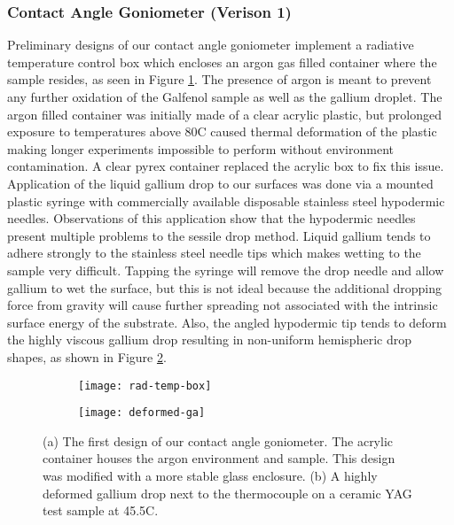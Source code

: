 \subsubsection{Contact Angle Goniometer (Verison 1)}
Preliminary designs of our contact angle goniometer implement a radiative temperature control box which encloses an argon gas filled container where the sample resides, as seen in Figure \ref{fig:rad-temp-box}.  The presence of argon is meant to prevent any further oxidation of the Galfenol sample as well as the gallium droplet. The argon filled container was initially made of a clear acrylic plastic, but prolonged exposure to temperatures above 80\degree C caused thermal deformation of the plastic making longer experiments impossible to perform without environment contamination.  A clear pyrex container replaced the acrylic box to fix this issue.  Application of the liquid gallium drop to our surfaces was done via a mounted plastic syringe with commercially available disposable stainless steel hypodermic needles.  Observations of this application show that the hypodermic needles present multiple problems to the sessile drop method.  Liquid gallium tends to adhere strongly to the stainless steel needle tips which makes wetting to the sample very difficult.  Tapping the syringe will remove the drop needle and allow gallium to wet the surface, but this is not ideal because the additional dropping force from gravity will cause further spreading not associated with the intrinsic surface energy of the substrate.  Also, the angled hypodermic tip tends to deform the highly viscous gallium drop resulting in non-uniform hemispheric drop shapes, as shown in Figure \ref{fig:deformed-ga}.
\begin{figure}
	\centering
	\begin{subfigure}[c]{0.45\textwidth}
		\texttt{[image: rad-temp-box]}
		\subcaption{~}
		\label{fig:rad-temp-box}		
	\end{subfigure}
	\begin{subfigure}[c]{0.45\textwidth} 
		\texttt{[image: deformed-ga]}
		\subcaption{~}
		\label{fig:deformed-ga}		
	\end{subfigure}
	\caption{(a) The first design of our contact angle goniometer.  The acrylic container houses the argon environment and sample.  This design was modified with a more stable glass enclosure. (b) A highly deformed gallium drop next to the thermocouple on a ceramic YAG test sample at 45.5\degree C.}
	\label{fig:prelim-design}
\end{figure}

